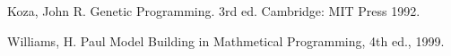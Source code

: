 \documentclass[USenglish,twocolumn]{article}
\begin{document}
%
%

\begin{thebibliography}{9}



Koza, John R. Genetic Programming. 3rd ed. Cambridge: MIT Press 1992.

Williams, H. Paul Model Building in Mathmetical Programming, 4th ed., 1999.


\end{thebibliography}
\end{document}
